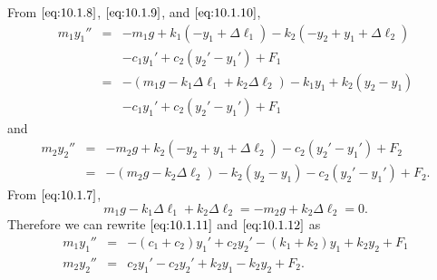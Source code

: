 \documentclass{ximera}
\begin{document}
\begin{example}
\begin{explanation}
From $\eqref{eq:10.1.8}$, $\eqref{eq:10.1.9}$, and $\eqref{eq:10.1.10}$,
\begin{equation} \label{eq:10.1.11}
\begin{array}{ccl}
m_1y_1''&=&-m_1g+k_1(-y_1+\Delta\ell_1)-k_2(-y_2+y_1+\Delta\ell_2)\\
  & &-c_1y_1'+c_2(y_2'-y_1')+F_1\\
&=&-(m_1g-k_1\Delta\ell_1+k_2\Delta\ell_2)-k_1y_1+k_2(y_2-y_1)\\
& &-c_1y_1'+c_2(y_2'-y_1')+F_1
\end{array}
\end{equation}
and
\begin{equation} \label{eq:10.1.12}
\begin{array}{ccl}
m_2y_2''&=&-m_2g+k_2(-y_2+y_1+\Delta\ell_2)-c_2(y_2'-y_1')+F_2\\
&=&-(m_2g-k_2\Delta\ell_2)-k_2(y_2-y_1)-c_2(y_2'-y_1')+F_2.
\end{array}
\end{equation}
From $\eqref{eq:10.1.7}$,
$$
m_1g-k_1\Delta\ell_1+k_2\Delta\ell_2=-m_2g+k_2\Delta\ell_2=0.
$$
Therefore we can rewrite $\eqref{eq:10.1.11}$ and $\eqref{eq:10.1.12}$
as
\begin{eqnarray*}
m_1y_1''&=&-(c_1+c_2)y_1'+c_2y_2'-(k_1+k_2)y_1+k_2y_2+F_1\\
m_2y_2''&=&c_2y_1'-c_2y_2'+k_2y_1-k_2y_2+F_2.
\end{eqnarray*}
\end{explanation}
\end{example}
\end{document}
